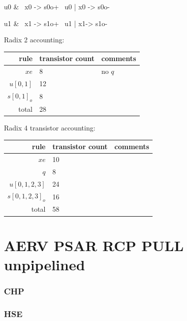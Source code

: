 \documentclass{article}
\begin{document}
\begin{prs2}
u0 & ~x0 -> s0o+
~u0 | x0 -> s0o-

u1 & ~x1 -> s1o+
~u1 | x1-> s1o-
\end{prs2}

\noindent
Radix 2 accounting:

\begin{center}
    \begin{tabular}{|r|l|l|}
    \hline
    rule & transistor count & comments \\ \hline
    $xe$ & 8 & no $q$ \\ \hline
    $u[0,1]$ & 12 & \\ \hline
    $s[0,1]_o$ & 8 & \\ \hline
    \hline total & 28 & \\ \hline
    \end{tabular}
\end{center}

\noindent
Radix 4 transistor accounting:

\begin{center}
    \begin{tabular}{|r|l|l|}
    \hline
    rule & transistor count & comments \\ \hline
    $xe$ & 10 & \\ \hline
    $q$ & 8 & \\ \hline
    $u[0,1,2,3]$ & 24 & \\ \hline
    $s[0,1,2,3]_o$ & 16 & \\ \hline
    \hline total & 58 & \\ \hline
    \end{tabular}
\end{center}

\section{AERV PSAR RCP PULL unpipelined \label{sec:AERV_PSAR_RCP_PULL_u}}

\subsubsection*{CHP}

\subsubsection*{HSE}
\end{document}
